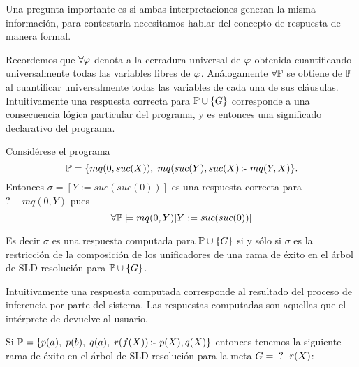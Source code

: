 \documentclass[11pt,letterpaper]{article}
\begin{document}
Una pregunta importante es si ambas interpretaciones generan la misma
informaci\'on, para contestarla necesitamos hablar del concepto de
respuesta de manera formal.



Recordemos que $\fa\vp$ denota a la cerradura universal de $\vp$ obtenida 
cuantificando universalmente todas las variables libres de $\vp$. 
An\'alogamente $\fa\P$ se obtiene de  $\P$ al cuantificar universalmente todas 
las variables de cada una de sus cl\'ausulas. Intuitivamente una respuesta
correcta para $\P\cup\{G\}$ corresponde a una consecuencia l\'ogica
particular del programa, y es entonces una significado declarativo del
programa. 

\beje Consid\'erese el programa
\[
\P=\{mq(0,suc(X)),\;mq(suc(Y),suc(X)\impp
mq(Y,X)\}.
\] 
Entonces $\sigma=[Y:=suc(suc(0))]$ es una respuesta
correcta para $?-mq(0,Y)$ pues 
\[
\fa\P\models mq(0,Y)[Y:=suc(suc(0))]
\]
\eeje


Es decir $\sigma$ es una respuesta computada para $\P\cup\{G\}$ si y
s\'olo si $\sigma$ es la restricci\'on de la composici\'on de los unificadores 
de una rama de \'exito en el \'arbol de SLD-resoluci\'on para $\P\cup\{G\}$.

Intuitivamente una respuesta computada corresponde al resultado del proceso de 
inferencia por parte del sistema. Las respuestas computadas son aquellas que el 
int\'erprete de {\pl} devuelve al usuario. 

\beje
Si $\P=\{p(a),\;p(b),\;q(a),\;r(f(X))\impp p(X),q(X)\}$ entonces
tenemos la siguiente rama de \'exito en el \'arbol de SLD-resoluci\'on para la 
meta $G=\meta r(X)$:
\end{document}
